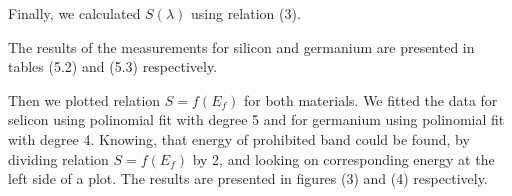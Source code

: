 \documentclass[a4paper,11pt]{article}
\begin{document}
\begin{minipage}[t]{0.5\textwidth}
                \par Finally, we calculated $S(\lambda)$ using relation (3). 
                \par The results of the measurements for silicon and germanium are presented in tables (5.2) and (5.3) respectively.
                \par Then we plotted relation $S = f(E_f)$ for both materials. We fitted the data for selicon using polinomial fit with degree 5 and for germanium using polinomial fit with degree 4. Knowing, that energy of prohibited band could be found, by dividing relation $S = f(E_f)$ by 2, and looking on corresponding energy at the left side of a plot. The results are presented in figures (3) and (4) respectively.

                
    \end{minipage}
    \hspace{10pt}
\end{document}

